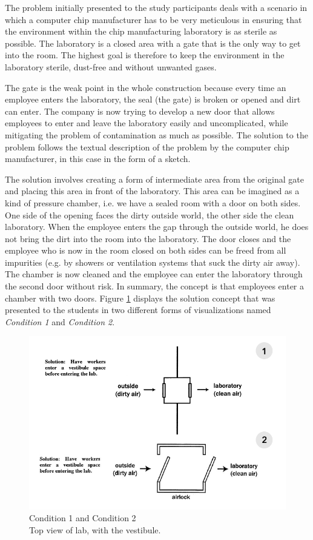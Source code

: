 \documentclass[12pt]{article}
\begin{document}
The problem initially presented to the study participants deals with a scenario in which a computer chip manufacturer has to be very meticulous in ensuring that the environment within the chip manufacturing laboratory is as sterile as possible. The laboratory is a closed area with a gate that is the only way to get into the room. The highest goal is therefore to keep the environment in the laboratory sterile, dust-free and without unwanted gases. 

The gate is the weak point in the whole construction because every time an employee enters the laboratory, the seal (the gate) is broken or opened and dirt can enter. The company is now trying to develop a new door that allows employees to enter and leave the laboratory easily and uncomplicated, while mitigating the problem of contamination as much as possible. The solution to the problem follows the textual description of the problem by the computer chip manufacturer, in this case in the form of a sketch. 

The solution involves creating a form of intermediate area from the original gate and placing this area in front of the laboratory. This area can be imagined as a kind of pressure chamber, i.e. we have a sealed room with a door on both sides. One side of the opening faces the dirty outside world, the other side the clean laboratory. When the employee enters the gap through the outside world, he does not bring the dirt into the room into the laboratory. The door closes and the employee who is now in the room closed on both sides can be freed from all impurities (e.g. by showers or ventilation systems that suck the dirty air away). The chamber is now cleaned and the employee can enter the laboratory through the second door without risk. In summary, the concept is that employees enter a chamber with two doors. Figure \ref{fig:input_conditions} displays the solution concept that was presented to the students in two different forms of visualizations named \textit{Condition 1} and \textit{Condition 2}.

\begin{figure}[H]
  \centering
  \includegraphics[width=0.7\linewidth]{images/input_conditons.PNG}
  \caption{\label{fig:input_conditions} Condition 1 and Condition 2 \\ Top view of lab, with the vestibule. \protect\cite[pp. 205-207]{davies2009computational}}
\end{figure}     
\end{document}
